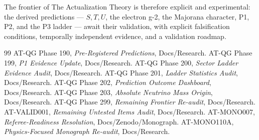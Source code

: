 The frontier of The Actualization Theory is therefore explicit and experimental: the derived
predictions --- $S,T,U$, the electron g-2, the Majorana character, P1, P2, and the P3
ladder --- await their validation, with explicit falsification conditions, temporally
independent evidence, and a validation roadmap.

\begin{thebibliography}{99}
 AT-QG Phase 190, \emph{Pre-Registered Predictions}, Docs/Research.
 AT-QG Phase 199, \emph{P1 Evidence Update}, Docs/Research.
 AT-QG Phase 200, \emph{Sector Ladder Evidence Audit}, Docs/Research.
 AT-QG Phase 201, \emph{Ladder Statistics Audit}, Docs/Research.
 AT-QG Phase 202, \emph{Prediction Outcome Dashboard}, Docs/Research.
 AT-QG Phase 203, \emph{Absolute Neutrino Mass Origin}, Docs/Research.
 AT-QG Phase 299, \emph{Remaining Frontier Re-audit}, Docs/Research.
 AT-VALID001, \emph{Remaining Untested Items Audit}, Docs/Research.
 AT-MONO007, \emph{Referee-Readiness Resolution}, Docs/Zenodo/Monograph.
 AT-MONO110A, \emph{Physics-Focused Monograph Re-audit}, Docs/Research.
\end{thebibliography}
